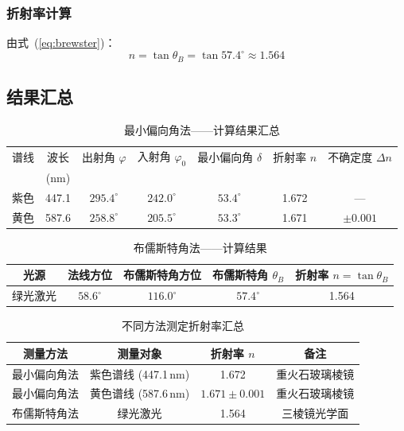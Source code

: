 \documentclass[UTF8]{article}
\begin{document}
\subsubsection{折射率计算}

由式~(\ref{eq:brewster})：
\[
n = \tan \theta_B = \tan 57.4^\circ \approx \boxed{1.564}
\]

\subsection{结果汇总}

\begin{table}[H]
\centering
\caption{最小偏向角法——计算结果汇总}
\begin{tabular}{ccccccc}
\toprule
谱线 & 波长 & 出射角 $\varphi$ & 入射角 $\varphi_0$ & 最小偏向角 $\delta$ & 折射率 $n$ & 不确定度 $\Delta n$ \\
     & (nm)  &                  &                    &                     &            &                      \\
\midrule
紫色 & 447.1 & $295.4^\circ$ & $242.0^\circ$ & $53.4^\circ$ & 1.672 & — \\
黄色 & 587.6 & $258.8^\circ$ & $205.5^\circ$ & $53.3^\circ$ & 1.671 & $\pm 0.001$ \\
\bottomrule
\end{tabular}
\end{table}

\begin{table}[H]
\centering
\caption{布儒斯特角法——计算结果}
\begin{tabular}{ccccc}
\toprule
光源 & 法线方位 & 布儒斯特角方位 & 布儒斯特角 $\theta_B$ & 折射率 $n = \tan\theta_B$ \\
\midrule
绿光激光 & $58.6^\circ$ & $116.0^\circ$ & $57.4^\circ$ & 1.564 \\
\bottomrule
\end{tabular}
\end{table}

\begin{table}[H]
\centering
\caption{不同方法测定折射率汇总}
\begin{tabular}{cccc}
\toprule
测量方法 & 测量对象 & 折射率 $n$ & 备注 \\
\midrule
最小偏向角法 & 紫色谱线 (447.1\,nm) & 1.672 & 重火石玻璃棱镜 \\
最小偏向角法 & 黄色谱线 (587.6\,nm) & $1.671 \pm 0.001$ & 重火石玻璃棱镜 \\
布儒斯特角法 & 绿光激光            & 1.564 & 三棱镜光学面 \\
\bottomrule
\end{tabular}
\end{table}
\end{document}

